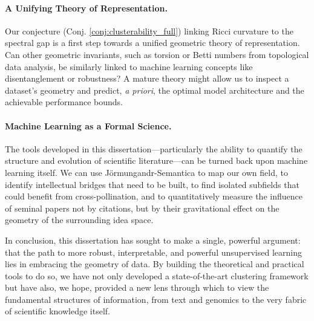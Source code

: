 \paragraph{A Unifying Theory of Representation.} Our conjecture (Conj. \ref{conj:clusterability_full}) linking Ricci curvature to the spectral gap is a first step towards a unified geometric theory of representation. Can other geometric invariants, such as torsion or Betti numbers from topological data analysis, be similarly linked to machine learning concepts like disentanglement or robustness? A mature theory might allow us to inspect a dataset's geometry and predict, \textit{a priori}, the optimal model architecture and the achievable performance bounds.

\paragraph{Machine Learning as a Formal Science.} The tools developed in this dissertation—particularly the ability to quantify the structure and evolution of scientific literature—can be turned back upon machine learning itself. We can use Jörmungandr-Semantica to map our own field, to identify intellectual bridges that need to be built, to find isolated subfields that could benefit from cross-pollination, and to quantitatively measure the influence of seminal papers not by citations, but by their gravitational effect on the geometry of the surrounding idea space.

In conclusion, this dissertation has sought to make a single, powerful argument: that the path to more robust, interpretable, and powerful unsupervised learning lies in embracing the geometry of data. By building the theoretical and practical tools to do so, we have not only developed a state-of-the-art clustering framework but have also, we hope, provided a new lens through which to view the fundamental structures of information, from text and genomics to the very fabric of scientific knowledge itself.